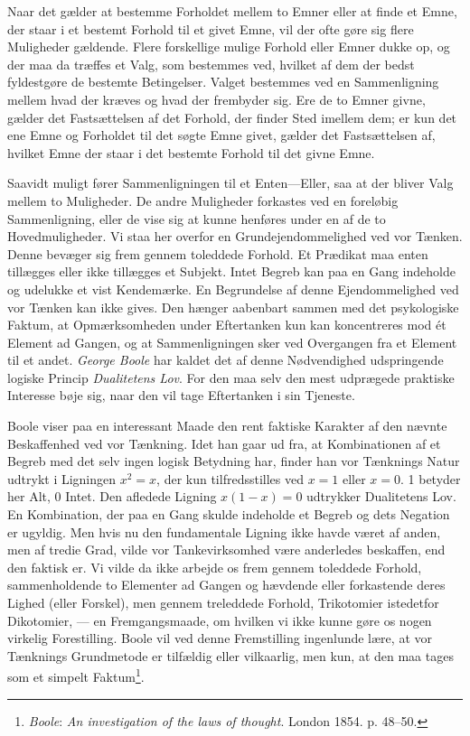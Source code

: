 \documentclass[12pt,a4paper]{book}
\newcommand{\apage}[1]{\marginnote{\footnotesize\textit{[#1]}}}
\begin{document}
Naar det gælder at bestemme Forholdet mellem to Emner eller at finde et
Emne, der staar i et bestemt Forhold til et givet Emne, vil der ofte
gøre sig flere Muligheder gældende. Flere forskellige mulige Forhold
eller Emner dukke op, og der maa da træffes et Valg, som bestemmes ved,
hvilket af dem der bedst fyldestgøre de bestemte Betingelser. Valget
bestemmes ved en Sammenligning mellem hvad der kræves og hvad der
frembyder sig. Ere de to Emner givne, gælder det Fastsættelsen af det
Forhold, der finder Sted imellem dem; er kun det ene Emne og Forholdet
til det søgte Emne givet, gælder det Fastsættelsen af, hvilket Emne der
staar i det bestemte Forhold til det givne Emne.

Saavidt muligt fører Sammenligningen til et Enten---Eller, saa at der
bliver Valg mellem to Muligheder. De andre Muligheder forkastes ved en
foreløbig Sammenligning, eller de vise sig at kunne henføres under en af
de to Hovedmuligheder. Vi staa her overfor en Grundejendommelighed ved
vor Tænken. Denne bevæger sig frem gennem toleddede Forhold. Et Prædikat
maa enten tillægges eller ikke tillægges et Subjekt. Intet Begreb kan
paa en Gang indeholde og udelukke et vist Kendemærke. En Begrundelse af
denne \apage{68} Ejendommelighed ved vor Tænken kan ikke gives. Den hænger
aabenbart sammen med det psykologiske Faktum, at Opmærksomheden under
Eftertanken kun kan koncentreres mod ét Element ad Gangen, og at
Sammenligningen sker ved Overgangen fra et Element til et andet.
\emph{George Boole} har kaldet det af denne Nødvendighed udspringende
logiske Princip \emph{Dualitetens Lov}. For den maa selv den mest
udprægede praktiske Interesse bøje sig, naar den vil tage Eftertanken i
sin Tjeneste.

Boole viser paa en interessant Maade den rent faktiske Karakter af den
nævnte Beskaffenhed ved vor Tænkning. Idet han gaar ud fra, at
Kombinationen af et Begreb med det selv ingen logisk Betydning har,
finder han vor Tænknings Natur udtrykt i Ligningen $x^2 = x$, der kun
tilfredsstilles ved $x = 1$ eller $x = 0$. 1 betyder her Alt, 0 Intet.
Den afledede Ligning $x(1-x) = 0$ udtrykker Dualitetens Lov. En
Kombination, der paa en Gang skulde indeholde et Begreb og dets Negation
er ugyldig. Men hvis nu den fundamentale Ligning ikke havde været af
anden, men af tredie Grad, vilde vor Tankevirksomhed være anderledes
beskaffen, end den faktisk er. Vi vilde da ikke arbejde os frem gennem
toleddede Forhold, sammenholdende to Elementer ad Gangen og hævdende
eller forkastende deres Lighed (eller Forskel), men gennem treleddede
Forhold, Trikotomier istedetfor Dikotomier, --- en Fremgangsmaade, om
hvilken vi ikke kunne gøre os nogen virkelig Forestilling. Boole vil ved
denne Fremstilling ingenlunde lære, at vor Tænknings Grundmetode er
tilfældig eller vilkaarlig, men kun, at den maa tages som et simpelt
Faktum\footnote{\emph{Boole}: \emph{An investigation of the laws of
thought}. London 1854. p. 48--50.}.
\end{document}

